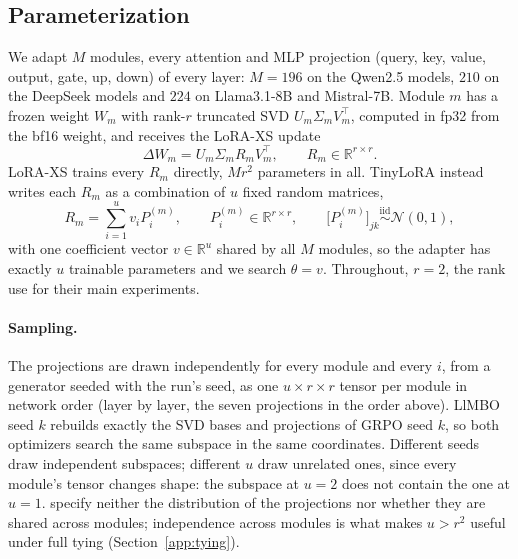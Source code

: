 \documentclass[twoside]{article}
\newcommand{\mcN}{\mathcal{N}}
\newcommand{\mbR}{\mathbb{R}}
\newcommand{\llmbo}{LlMBO}
\begin{document}
\subsection{Parameterization}
\label{app:param}
We adapt $M$ modules, every attention and MLP projection (query, key, value, output, gate, up, down) of every layer: $M = 196$ on the Qwen2.5 models, $210$ on the DeepSeek models and $224$ on Llama3.1-8B and Mistral-7B. Module $m$ has a frozen weight $W_m$ with rank-$r$ truncated SVD $U_m \Sigma_m V_m^\top$, computed in fp32 from the bf16 weight, and receives the LoRA-XS update \citep{balazy2024loraxs}
\begin{equation}
    \Delta W_m = U_m \Sigma_m R_m V_m^\top, \qquad R_m \in \mbR^{r \times r}.
\end{equation}
LoRA-XS trains every $R_m$ directly, $M r^2$ parameters in all. TinyLoRA instead writes each $R_m$ as a combination of $u$ fixed random matrices,
\begin{equation}
    R_m = \sum_{i=1}^{u} v_i P^{(m)}_i, \qquad P^{(m)}_i \in \mbR^{r \times r}, \qquad \big[P^{(m)}_i\big]_{jk} \overset{\text{iid}}{\sim} \mcN(0, 1),
    \label{eq:app-tinylora}
\end{equation}
with one coefficient vector $v \in \mbR^u$ shared by all $M$ modules, so the adapter has exactly $u$ trainable parameters and we search $\theta = v$. Throughout, $r = 2$, the rank \citet{morris2026learning} use for their main experiments.

\paragraph{Sampling.}
The projections are drawn independently for every module and every $i$, from a generator seeded with the run's seed, as one $u \times r \times r$ tensor per module in network order (layer by layer, the seven projections in the order above). \llmbo{} seed $k$ rebuilds exactly the SVD bases and projections of GRPO seed $k$, so both optimizers search the same subspace in the same coordinates. Different seeds draw independent subspaces; different $u$ draw unrelated ones, since every module's tensor changes shape: the subspace at $u = 2$ does not contain the one at $u = 1$. \citet{morris2026learning} specify neither the distribution of the projections nor whether they are shared across modules; independence across modules is what makes $u > r^2$ useful under full tying (Section~\ref{app:tying}).
\end{document}
